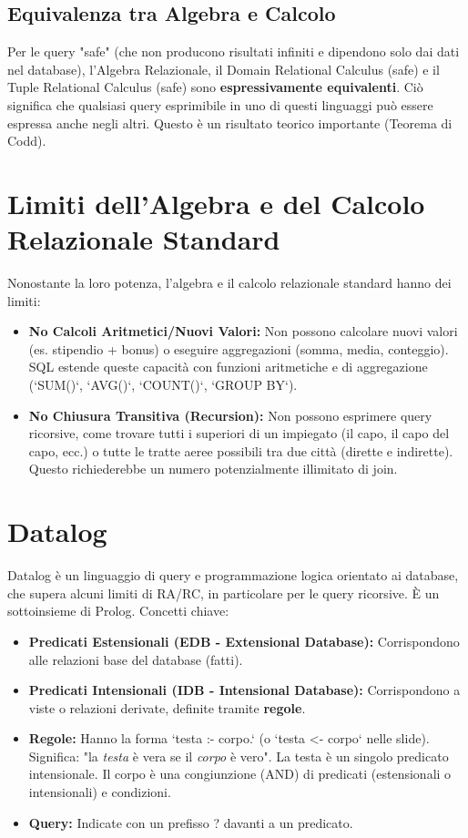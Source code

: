 	\subsection{Equivalenza tra Algebra e Calcolo}
	Per le query "safe" (che non producono risultati infiniti e dipendono solo dai dati nel database), l'Algebra Relazionale, il Domain Relational Calculus (safe) e il Tuple Relational Calculus (safe) sono \textbf{espressivamente equivalenti}. Ciò significa che qualsiasi query esprimibile in uno di questi linguaggi può essere espressa anche negli altri. Questo è un risultato teorico importante (Teorema di Codd).
	
	\section{Limiti dell'Algebra e del Calcolo Relazionale Standard}
	Nonostante la loro potenza, l'algebra e il calcolo relazionale standard hanno dei limiti:
	\begin{itemize}
		\item \textbf{No Calcoli Aritmetici/Nuovi Valori:} Non possono calcolare nuovi valori (es. stipendio + bonus) o eseguire aggregazioni (somma, media, conteggio). SQL estende queste capacità con funzioni aritmetiche e di aggregazione (`SUM()`, `AVG()`, `COUNT()`, `GROUP BY`).
		\item \textbf{No Chiusura Transitiva (Recursion):} Non possono esprimere query ricorsive, come trovare tutti i superiori di un impiegato (il capo, il capo del capo, ecc.) o tutte le tratte aeree possibili tra due città (dirette e indirette). Questo richiederebbe un numero potenzialmente illimitato di join.
	\end{itemize}
	
	\section{Datalog}
	Datalog è un linguaggio di query e programmazione logica orientato ai database, che supera alcuni limiti di RA/RC, in particolare per le query ricorsive. È un sottoinsieme di Prolog.
	Concetti chiave:
	\begin{itemize}
		\item \textbf{Predicati Estensionali (EDB - Extensional Database):} Corrispondono alle relazioni base del database (fatti).
		\item \textbf{Predicati Intensionali (IDB - Intensional Database):} Corrispondono a viste o relazioni derivate, definite tramite \textbf{regole}.
		\item \textbf{Regole:} Hanno la forma `testa :- corpo.` (o `testa <- corpo` nelle slide).
		Significa: "la \textit{testa} è vera se il \textit{corpo} è vero".
		La testa è un singolo predicato intensionale. Il corpo è una congiunzione (AND) di predicati (estensionali o intensionali) e condizioni.
		\item \textbf{Query:} Indicate con un prefisso ? davanti a un predicato.
	\end{itemize}
	
